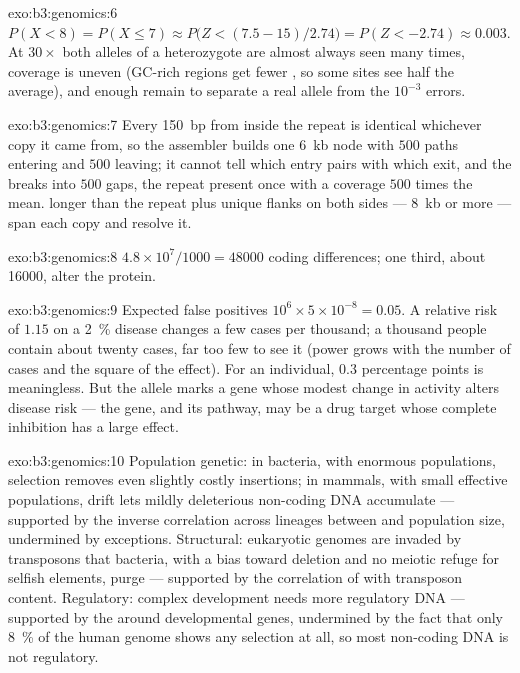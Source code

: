 \begin{solution}{exo:b3:genomics:6}
$P(X < 8) = P(X \le 7) \approx P\bigl(Z < (7.5 - 15)/2.74\bigr) =
P(Z < -2.74) \approx 0.003$. At $30\times$ both alleles of a
heterozygote are almost always seen many times, coverage is uneven
(GC-rich regions get fewer , so some sites see half the average),
and enough  remain to separate a real allele from the $10^{-3}$
errors.
\end{solution}

\begin{solution}{exo:b3:genomics:7}
Every \qty{150}{bp}  from inside the repeat is identical whichever
copy it came from, so the assembler builds one \qty{6}{kb} node with
$500$ paths entering and $500$ leaving; it cannot tell which entry
pairs with which exit, and the  breaks into $500$ gaps, the
repeat present once with a coverage $500$ times the mean.  longer
than the repeat plus unique flanks on both sides --- \qty{8}{kb} or
more --- span each copy and resolve it.
\end{solution}

\begin{solution}{exo:b3:genomics:8}
$4.8\times 10^{7}/1000 = \num{48000}$ coding differences; one third,
about \num{16000}, alter the protein.
\end{solution}

\begin{solution}{exo:b3:genomics:9}
Expected false positives $10^{6}\times 5\times 10^{-8} = 0.05$. A
relative risk of $1.15$ on a \qty{2}{\%} disease changes a few cases
per thousand; a thousand people contain about twenty cases, far too
few to see it (power grows with the number of cases and the square of
the effect). For an individual, $0.3$ percentage points is
meaningless. But the allele marks a gene whose modest change in
activity alters disease risk --- the gene, and its pathway, may be a
drug target whose complete inhibition has a large effect.
\end{solution}

\begin{solution}{exo:b3:genomics:10}
Population genetic: in bacteria, with enormous populations, selection
removes even slightly costly insertions; in mammals, with small
effective populations, drift lets mildly deleterious non-coding DNA
accumulate --- supported by the inverse correlation across lineages
between  and population size, undermined by exceptions.
Structural: eukaryotic genomes are invaded by transposons that
bacteria, with a bias toward deletion and no meiotic refuge for
selfish elements, purge --- supported by the correlation of 
with transposon content. Regulatory: complex development needs more
regulatory DNA --- supported by the 
around developmental genes, undermined by the fact that only
\qty{8}{\%} of the human genome shows any selection at all, so most
non-coding DNA is not regulatory.
\end{solution}

